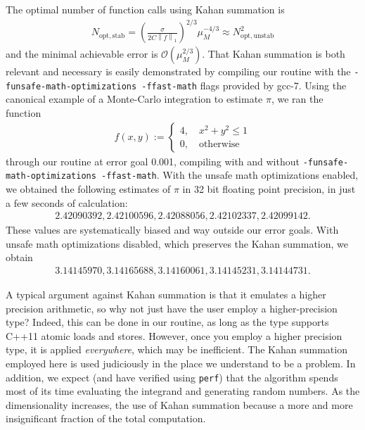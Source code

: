 \documentclass{ansarticle}
\begin{document}
The optimal number of function calls using Kahan summation is
\begin{align*}
N_{\mathrm{opt, stab}} = \left( \frac{\sigma}{2C\left\|f\right\|_{1} }\right)^{2/3}  \mu_{M}^{-4/3} \approx N_{\mathrm{opt,unstab}}^{2}
\end{align*}
and the minimal achievable error is $\mathcal{O}(\mu_{M}^{2/3})$.
That Kahan summation is both relevant and necessary is easily demonstrated by compiling our routine with the \texttt{-funsafe-math-optimizations -ffast-math} flags provided by gcc-7.
Using the canonical example of a Monte-Carlo integration to estimate $\pi$, we ran the function
\begin{align*}
f(x, y) :=
\begin{cases}
4, \quad x^2 + y^2 \le 1	\\
0, \quad \textrm{otherwise}
\end{cases}
\end{align*}
through our routine at error goal 0.001, compiling with and without  \texttt{-funsafe-math-optimizations -ffast-math}.
With the unsafe math optimizations enabled, we obtained the following estimates of $\pi$ in 32 bit floating point precision, in just a few seconds of calculation:
\begin{align*}
2.42090392, 2.42100596, 2.42088056, 2.42102337, 2.42099142.
\end{align*}
These values are systematically biased and way outside our error goals.
With unsafe math optimizations disabled, which preserves the Kahan summation, we obtain 
\begin{align*}
3.14145970, 3.14165688, 3.14160061, 3.14145231, 3.14144731.
\end{align*}



A typical argument against Kahan summation is that it emulates a higher precision arithmetic, so why not just have the user employ a higher-precision type? Indeed, this can be done in our routine, as long as the type supports C++11 atomic loads and stores.
However, once you employ a higher precision type, it is applied \emph{everywhere}, which may be inefficient.
The Kahan summation employed here is used judiciously in the place we understand to be a problem.
In addition, we expect (and have verified using \texttt{perf}) that the algorithm spends most of its time evaluating the integrand and generating random numbers.
As the dimensionality increases, the use of Kahan summation because a more and more insignificant fraction of the total computation.
\end{document}

